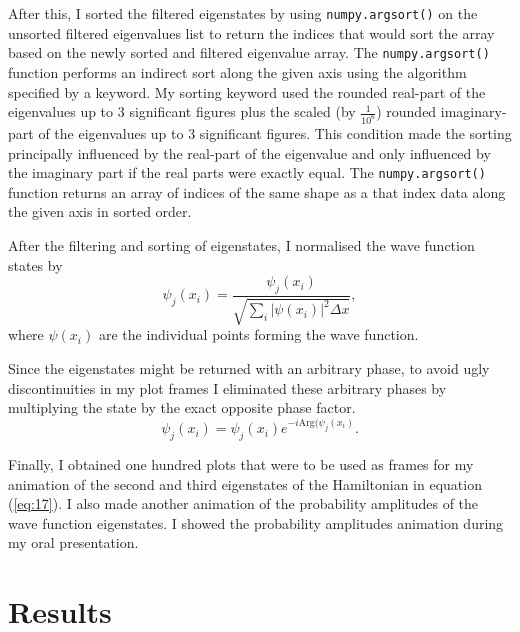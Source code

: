 \documentclass[10pt, a4paper, singlespacing]{report}
\begin{document}
After this, I sorted the filtered eigenstates by using \texttt{numpy.argsort()} on the unsorted filtered eigenvalues list to return the indices that would sort the array based on the newly sorted and filtered eigenvalue array. The \texttt{numpy.argsort()} function performs an indirect sort along the given axis using the algorithm specified by a keyword. My sorting keyword used the rounded real-part of the eigenvalues up to 3 significant figures plus the scaled (by $\frac{1}{10^6}$) rounded imaginary-part of the eigenvalues up to 3 significant figures. This condition made the sorting principally influenced by the real-part of the eigenvalue and only influenced by the imaginary part if the real parts were exactly equal. The \texttt{numpy.argsort()} function returns an array of indices of the same shape as a that index data along the given axis in sorted order\cite{argsort}.

After the filtering and sorting of eigenstates, I normalised the wave function states by 
\begin{equation}
\psi_{j}(x_{i}) = \frac{\psi_{j}(x_{i})}{\sqrt{\sum_{i} |\psi(x_{i})|^2 \Delta x}},
\end{equation}
where $\psi(x_{i})$ are the individual points forming the wave function.

Since the eigenstates might be returned with an arbitrary phase, to avoid ugly discontinuities in my plot frames I eliminated these arbitrary phases by multiplying the state by the exact opposite phase factor.
\begin{equation}
\psi_{j}(x_{i}) = \psi_{j}(x_{i}) e^{-i\mathrm{Arg}(\psi_{j}(x_{i})}.
\end{equation}

Finally, I obtained one hundred plots that were to be used as frames for my animation of the second and third eigenstates of the Hamiltonian in equation (\ref{eq:17}). I also made another animation of the probability amplitudes of the wave function eigenstates. I showed the probability amplitudes animation during my oral presentation.
\vspace*{5cm}

\section{Results}
\end{document}
